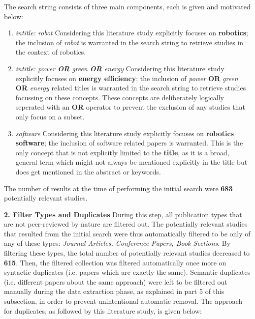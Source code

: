 The search string consists of three main components, each is given and motivated below:
\begin{enumerate}
    \item \textit{intitle: robot} \newline
    Considering this literature study explicitly focuses on \textbf{robotics}; 
    the inclusion of \textit{robot} is warranted in the search string to retrieve studies in the context of robotics.

    \item \textit{intitle: power \textbf{OR} green \textbf{OR} energy} \newline 
    Considering this literature study explicitly focuses on \textbf{energy efficiency};
    the inclusion of \textit{power} \textbf{OR} \textit{green} \textbf{OR} \textit{energy} related titles is warranted in the search string to retrieve studies focussing on 
    these concepts.
    These concepts are deliberately logically seperated with an \textbf{OR} operator to prevent the exclusion of any studies that only focus on a subset.

    \item \textit{software} \newline
    Considering this literature study explicitly focuses on \textbf{robotics software};
    the inclusion of software related papers is warranted.
    This is the only concept that is not explicitly limited to the \textbf{title}, as it is a broad, general term which might not always be mentioned
    explicitly in the title but does get mentioned in the abstract or keywords.
    
\end{enumerate}
The number of results at the time of performing the initial search were \textbf{683} potentially relevant studies.

\vspace{5mm}

\noindent\textbf{2. Filter Types and Duplicates}
During this step, all publication types that are not peer-reviewed by nature are filtered out. 
The potentially relevant studies that resulted from the initial search were thus automatically filtered to be only of any of these types: 
\textit{Journal Articles, Conference Papers, Book Sections}.
By filtering these types, the total number of potentially relevant studies decreased to \textbf{615}. 
Then, the filtered collection was filtered automatically once more on 
syntactic duplicates (i.e. papers which are exactly the same). 
Semantic duplicates (i.e. different papers about the same approach) were left to be filtered out manually during the data extraction phase, 
as explained in part 5 of this subsection, in order to prevent unintentional automatic removal. 
The approach for duplicates, as followed by this literature study, is given below:

